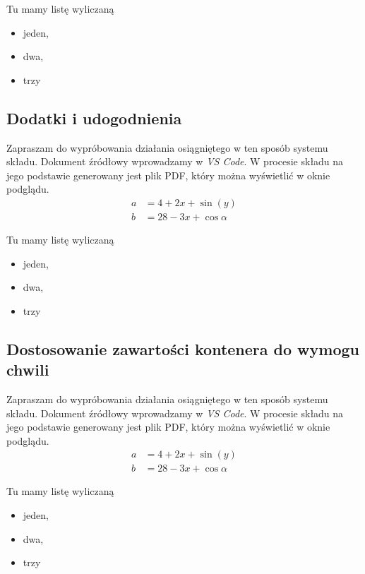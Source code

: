 \documentclass{article}
\newcommand{\vsc}{\textit{VS Code}\xspace}
\begin{document}
Tu mamy listę wyliczaną
\begin{itemize}
  \item jeden,
  \item dwa,
  \item trzy
\end{itemize}

\subsection{Dodatki i udogodnienia}

Zapraszam do wypróbowania działania osiągniętego w ten sposób systemu składu.
Dokument źródłowy wprowadzamy w \vsc{}.
W procesie składu na jego podstawie generowany jest plik PDF, który można wyświetlić w oknie podglądu.
\begin{align}
  a & = 4+2x+\sin(y)         \\
  b & = 28 -3 x + \cos\alpha
\end{align}

Tu mamy listę wyliczaną
\begin{itemize}
  \item jeden,
  \item dwa,
  \item trzy
\end{itemize}

\subsection{Dostosowanie zawartości kontenera do wymogu chwili}

Zapraszam do wypróbowania działania osiągniętego w ten sposób systemu składu.
Dokument źródłowy wprowadzamy w \vsc{}.
W procesie składu na jego podstawie generowany jest plik PDF, który można wyświetlić w oknie podglądu.
\begin{align}
  a & = 4+2x+\sin(y)         \\
  b & = 28 -3 x + \cos\alpha
\end{align}

Tu mamy listę wyliczaną
\begin{itemize}
  \item jeden,
  \item dwa,
  \item trzy
\end{itemize}
\end{document}
